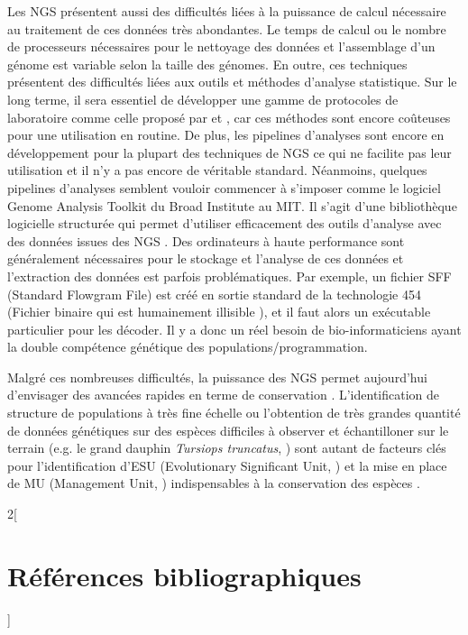 \documentclass[a4paper,12pt,twoside]{article}\usepackage[]{graphicx}\usepackage[]{color}
\begin{document}
Les NGS présentent aussi des difficultés liées à la puissance de calcul nécessaire au traitement de ces données très abondantes. Le temps de calcul ou le nombre de processeurs nécessaires pour le nettoyage des données et l'assemblage d'un génome est variable selon la taille des génomes. En outre, ces techniques présentent des difficultés liées aux outils et méthodes d'analyse statistique.  Sur le long terme, il sera essentiel de développer une gamme de protocoles de laboratoire comme celle proposé par \citet{zielinski2014development} et \citet{lighten2014aa}, car ces méthodes sont encore coûteuses pour une utilisation en routine. De plus, les pipelines d'analyses sont encore en développement pour la plupart des techniques de NGS \citep{lighten2014aa} ce qui ne facilite pas leur utilisation et il n'y a pas encore de véritable standard. Néanmoins, quelques pipelines d'analyses semblent vouloir commencer à s'imposer comme le logiciel Genome Analysis Toolkit du Broad Institute au MIT. Il s'agit d'une bibliothèque logicielle structurée qui permet d'utiliser efficacement des outils d'analyse avec des données issues des NGS \citep{lam2012detecting}. Des ordinateurs à haute performance sont généralement nécessaires pour le stockage et l'analyse de ces données \citep{shafer2015genomics, garner2015genomics} et l'extraction des données est parfois problématiques. Par exemple, un fichier SFF (Standard Flowgram File) est créé en sortie standard de la technologie 454 (Fichier binaire qui est humainement illisible \citealp{peyretaillade2011extreme}), et il faut alors un exécutable particulier pour les décoder. Il y a donc un réel besoin de bio-informaticiens ayant la double compétence génétique des populations/programmation.

Malgré ces nombreuses difficultés, la puissance des NGS permet aujourd'hui d'envisager des avancées rapides en terme de conservation \citep{shafer2015genomics}. L'identification de structure de populations à très fine échelle \citep{o2015rare} ou l'obtention de très grandes quantité de données génétiques sur des espèces difficiles à observer et échantilloner sur le terrain (e.g. le grand dauphin \emph{Tursiops truncatus}, \citealp{schipper2008status}) sont autant de facteurs clés pour l'identification d'ESU (Evolutionary Significant Unit, \citealp{ryder1986species}) et la mise en place de MU (Management Unit, \citealp{hawkins2016fisheries}) indispensables à la conservation des espèces \citep{casiraghi2016}.

\begin{otherlanguage}{english}
	\singlespacing
	\begin{multicols}{2}[\section*{Références bibliographiques}]
		\begingroup
		\def\chapter*#1{}
		\small
		\footnotesize
		
		
		\endgroup
	\end{multicols}
\end{otherlanguage}
\end{document}
